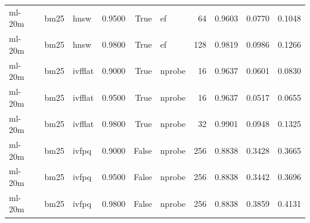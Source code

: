 \begin{tabular}{lllrrlrrrr}
ml-20m & bm25 & hnsw & 0.9500 & True & ef & 64 & 0.9603 & 0.0770 & 0.1048 \\
ml-20m & bm25 & hnsw & 0.9800 & True & ef & 128 & 0.9819 & 0.0986 & 0.1266 \\
ml-20m & bm25 & ivfflat & 0.9000 & True & nprobe & 16 & 0.9637 & 0.0601 & 0.0830 \\
ml-20m & bm25 & ivfflat & 0.9500 & True & nprobe & 16 & 0.9637 & 0.0517 & 0.0655 \\
ml-20m & bm25 & ivfflat & 0.9800 & True & nprobe & 32 & 0.9901 & 0.0948 & 0.1325 \\
ml-20m & bm25 & ivfpq & 0.9000 & False & nprobe & 256 & 0.8838 & 0.3428 & 0.3665 \\
ml-20m & bm25 & ivfpq & 0.9500 & False & nprobe & 256 & 0.8838 & 0.3442 & 0.3696 \\
ml-20m & bm25 & ivfpq & 0.9800 & False & nprobe & 256 & 0.8838 & 0.3859 & 0.4131 \\
\bottomrule
\end{tabular}
